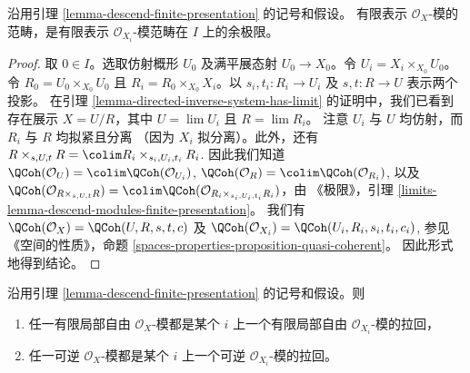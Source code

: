 \begin{lemma}
\label{lemma-descend-modules-finite-presentation}
沿用引理 \ref{lemma-descend-finite-presentation} 的记号和假设。
有限表示 $\mathcal{O}_X$-模的范畴，是有限表示
$\mathcal{O}_{X_i}$-模范畴在 $I$ 上的余极限。
\end{lemma}

\begin{proof}
取 $0 \in I$。选取仿射概形 $U_0$ 及满平展态射
$U_0 \to X_0$。令 $U_i = X_i \times_{X_0} U_0$。
令 $R_0 = U_0 \times_{X_0} U_0$ 且
$R_i = R_0 \times_{X_0} X_i$。以
$s_i,t_i : R_i \to U_i$ 及 $s,t : R \to U$ 表示两个投影。
在引理 \ref{lemma-directed-inverse-system-has-limit} 的证明中，我们已看到
存在展示 $X = U/R$，其中 $U = \lim U_i$ 且 $R = \lim R_i$。
注意 $U_i$ 与 $U$ 均仿射，而 $R_i$ 与 $R$ 均拟紧且分离
（因为 $X_i$ 拟分离）。此外，还有
$R \times_{s, U, t} R = \colim R_i \times_{s_i, U_i, t_i} R_i$.
因此我们知道
$\QCoh(\mathcal{O}_U) = \colim \QCoh(\mathcal{O}_{U_i})$,
$\QCoh(\mathcal{O}_R) = \colim \QCoh(\mathcal{O}_{R_i})$,
以及
$\QCoh(\mathcal{O}_{R \times_{s, U, t} R}) =
\colim \QCoh(\mathcal{O}_{R_i \times_{s_i, U_i, t_i} R_i})$，由
《极限》，引理 \ref{limits-lemma-descend-modules-finite-presentation}。
我们有 $\QCoh(\mathcal{O}_X) = \QCoh(U, R, s, t, c)$ 及
$\QCoh(\mathcal{O}_{X_i}) = \QCoh(U_i, R_i, s_i, t_i, c_i)$,
参见《空间的性质》，命题
\ref{spaces-properties-proposition-quasi-coherent}。
因此形式地得到结论。
\end{proof}

\begin{lemma}
\label{lemma-descend-invertible-modules}
沿用引理 \ref{lemma-descend-finite-presentation} 的记号和假设。则
\begin{enumerate}
\item 任一有限局部自由 $\mathcal{O}_X$-模都是某个 $i$ 上一个有限局部自由
$\mathcal{O}_{X_i}$-模的拉回，
\item 任一可逆 $\mathcal{O}_X$-模都是某个 $i$ 上一个可逆
$\mathcal{O}_{X_i}$-模的拉回。
\end{enumerate}
\end{lemma}

